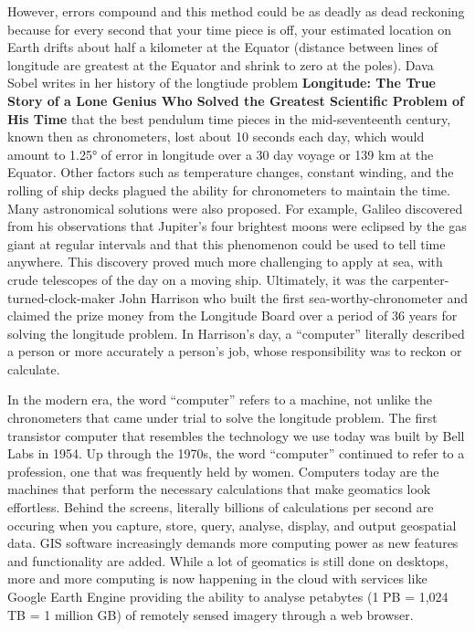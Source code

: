 \documentclass[
]{book}
\begin{document}
However, errors compound and this method could be as deadly as dead reckoning because for every second that your time piece is off, your estimated location on Earth drifts about half a kilometer at the Equator (distance between lines of longitude are greatest at the Equator and shrink to zero at the poles). Dava Sobel writes in her history of the longtiude problem \textbf{Longitude: The True Story of a Lone Genius Who Solved the Greatest Scientific Problem of His Time} that the best pendulum time pieces in the mid-seventeenth century, known then as chronometers, lost about 10 seconds each day, which would amount to 1.25° of error in longitude over a 30 day voyage or 139 km at the Equator. Other factors such as temperature changes, constant winding, and the rolling of ship decks plagued the ability for chronometers to maintain the time. Many astronomical solutions were also proposed. For example, Galileo discovered from his observations that Jupiter's four brightest moons were eclipsed by the gas giant at regular intervals and that this phenomenon could be used to tell time anywhere. This discovery proved much more challenging to apply at sea, with crude telescopes of the day on a moving ship. Ultimately, it was the carpenter-turned-clock-maker John Harrison who built the first sea-worthy-chronometer and claimed the prize money from the Longitude Board over a period of 36 years for solving the longitude problem. In Harrison's day, a ``computer'' literally described a person or more accurately a person's job, whose responsibility was to reckon or calculate.

In the modern era, the word ``computer'' refers to a machine, not unlike the chronometers that came under trial to solve the longitude problem. The first transistor computer that resembles the technology we use today was built by Bell Labs in 1954. Up through the 1970s, the word ``computer'' continued to refer to a profession, one that was frequently held by women. Computers today are the machines that perform the necessary calculations that make geomatics look effortless. Behind the screens, literally billions of calculations per second are occuring when you capture, store, query, analyse, display, and output geospatial data. GIS software increasingly demands more computing power as new features and functionality are added. While a lot of geomatics is still done on desktops, more and more computing is now happening in the cloud with services like Google Earth Engine providing the ability to analyse petabytes (1 PB = 1,024 TB = 1 million GB) of remotely sensed imagery through a web browser.
\end{document}
